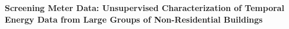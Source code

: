 \textbf{Screening Meter Data: Unsupervised Characterization of Temporal Energy Data from Large Groups of Non-Residential Buildings}
